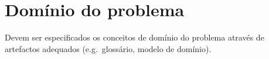 \section{Dom\'inio do problema} %
\label{sec:dominio}

Devem ser especificados os conceitos de domínio do problema através de artefactos adequados (e.g.\ glossário, modelo de domínio).

